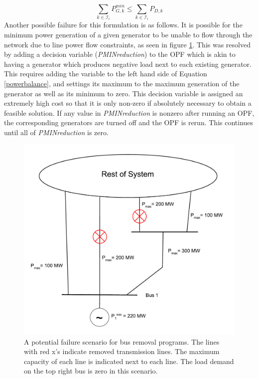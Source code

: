 \documentclass[12pt]{article}
\begin{document}
\begin{equation}
    \sum_{k \in \mathcal{I}_i} P_{G, k}^{min} \leq \sum_{k \in \mathcal{I}_i} P_{D, k}
    \label{eq:pminfailone}
\end{equation}
Another possible failure for this formulation is as follows. It is possible for the minimum power generation of a given generator to be unable to flow through the network due to line power flow constraints, as seen in figure \ref{fig:pminfailtwo}. This was resolved by adding a decision variable (\textit{PMINreduction}) to the OPF which is akin to having a generator which produces negative load next to each existing generator. This requires adding the variable to the left hand side of Equation \eqref{powerbalance}, and settings its maximum to the maximum generation of the generator as well as its minimum to zero. This decision variable is assigned an extremely high cost so that it is only non-zero if absolutely necessary to obtain a feasible solution. If any value in \textit{PMINreduction}  is nonzero after running an OPF, the corresponding generators are turned off and the OPF is rerun. This continues until all of \textit{PMINreduction} is zero. \par
\begin{figure}[ht]
    \centering %
    \includegraphics[scale=0.6]{Pminbroken2.pdf}
    \caption[Potential failure scenario for bus removal programs]{A potential failure scenario for bus removal programs. The lines with red x’s indicate removed transmission lines. The maximum capacity of each line is indicated next to each line. The load demand on the top right bus is zero in this scenario.}
    \label{fig:pminfailtwo}
\end{figure}
\end{document}
